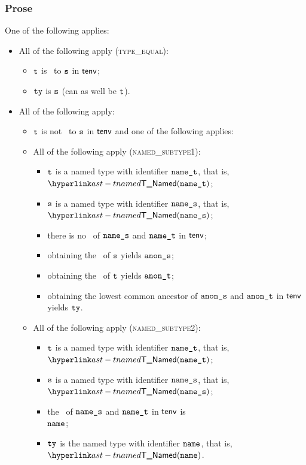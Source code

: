 \subsubsection{Prose}
One of the following applies:
\begin{itemize}
  \item All of the following apply (\textsc{type\_equal}):
  \begin{itemize}
    \item $\texttt{t}$ is \typeequal\ to $\texttt{s}$ in $\textsf{tenv}$;
    \item $\texttt{ty}$ is $\texttt{s}$ (can as well be $\texttt{t}$).
  \end{itemize}

  \item All of the following apply:
  \begin{itemize}
    \item $\texttt{t}$ is not \typeequal\ to $\texttt{s}$ in $\textsf{tenv}$ and one of the following applies:

    \item All of the following apply (\textsc{named\_subtype1}):
    \begin{itemize}
      \item $\texttt{t}$ is a named type with identifier $\texttt{name\_t}$, that is, $\TNamed(\namesubt)$;
      \item $\texttt{s}$ is a named type with identifier $\texttt{name\_s}$, that is, $\TNamed(\namesubs)$;
      \item there is no \namedlowestcommonancestor\ of $\texttt{name\_s}$ and $\texttt{name\_t}$ in $\textsf{tenv}$;
      \item obtaining the \underlyingtype\ of $\texttt{s}$ yields $\texttt{anon\_s}$\ProseOrTypeError;
      \item obtaining the \underlyingtype\ of $\texttt{t}$ yields $\texttt{anon\_t}$\ProseOrTypeError;
      \item obtaining the lowest common ancestor of $\texttt{anon\_s}$ and $\texttt{anon\_t}$ in $\textsf{tenv}$ yields $\texttt{ty}$\ProseOrTypeError.
    \end{itemize}

    \item All of the following apply (\textsc{named\_subtype2}):
    \begin{itemize}
      \item $\texttt{t}$ is a named type with identifier $\texttt{name\_t}$, that is, $\TNamed(\namesubt)$;
      \item $\texttt{s}$ is a named type with identifier $\texttt{name\_s}$, that is, $\TNamed(\namesubs)$;
      \item the \namedlowestcommonancestor\ of $\texttt{name\_s}$ and $\texttt{name\_t}$ in $\textsf{tenv}$ is \\
            $\texttt{name}$\ProseOrTypeError;
      \item $\texttt{ty}$ is the named type with identifier $\texttt{name}$, that is, $\TNamed(\name)$.
    \end{itemize}


\end{itemize}
\end{itemize}
